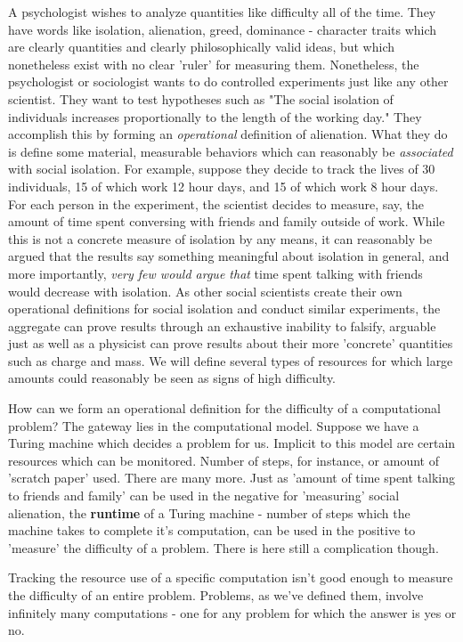 \documentclass{article}
\theoremstyle{definition}
\theoremstyle{plain}
\theoremstyle{theorem}
\begin{document}
A psychologist wishes to analyze quantities like difficulty all of the time. They have words like isolation, alienation, greed, dominance - character traits which are clearly quantities and clearly philosophically valid ideas, but which nonetheless exist with no clear 'ruler' for measuring them. Nonetheless, the psychologist or sociologist wants to do controlled experiments just like any other scientist. They want to test hypotheses such as "The social isolation of individuals increases proportionally to the length of the working day." They accomplish this by forming an \textit{operational} definition of alienation. What they do is define some material, measurable behaviors which can reasonably be \textit{associated} with social isolation. For example, suppose they decide to track the lives of 30 individuals, 15 of which work 12 hour days, and 15 of which work 8 hour days. For each person in the experiment, the scientist decides to measure, say, the amount of time spent conversing with friends and family outside of work. While this is not a concrete measure of isolation by any means, it can reasonably be argued that the results say something meaningful about isolation in general, and more importantly, \textit{very few would argue that} time spent talking with friends would decrease with isolation. As other social scientists create their own operational definitions for social isolation and conduct similar experiments, the aggregate can prove results through an exhaustive inability to falsify, arguable just as well as a physicist can prove results about their more 'concrete' quantities such as charge and mass. We will define several types of resources for which large amounts could reasonably be seen as signs of high difficulty. \par 
How can we form an operational definition for the difficulty of a computational problem? The gateway lies in the computational model. Suppose we have a Turing machine which decides a problem for us. Implicit to this model are certain resources which can be monitored. Number of steps, for instance, or amount of 'scratch paper' used. There are many more. Just as 'amount of time spent talking to friends and family' can be used in the negative for 'measuring' social alienation, the \textbf{runtime} of a Turing machine - number of steps which the machine takes to complete it's computation, can be used in the positive to 'measure' the difficulty of a problem. There is here still a complication though. \par 
Tracking the resource use of a specific computation isn't good enough to measure the difficulty of an entire problem. Problems, as we've defined them, involve infinitely many computations - one for any problem for which the answer is yes or no. 
\end{document}
